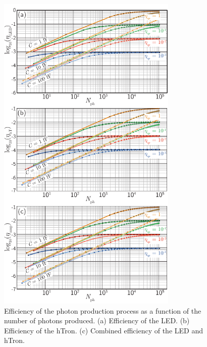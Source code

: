 \documentclass[aip,amsmath,amssymb,reprint,nofootinbib]{revtex4-1}
\begin{document}
\begin{figure}[t!]
	\centerline{\includegraphics[width=8.6cm]{_transmitters_efficiency_small.pdf}}
	\caption{\label{fig:transmitters_efficiency}Efficiency of the photon production process as a function of the number of photons produced. (a) Efficiency of the LED. (b) Efficiency of the hTron. (c) Combined efficiency of the LED and hTron.}
\end{figure}
\end{document}
